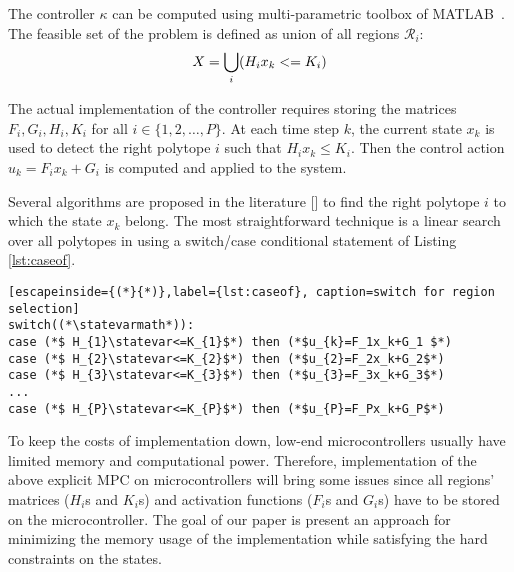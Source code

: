 
The controller $\kappa$ can be computed using multi-parametric toolbox of MATLAB~\cite{matlabMPT, matlabYALMIP}. The feasible set of the problem is defined as union of all regions $\mathcal{R}_{i}$:
\begin{equation}
X = \bigcup_{i}(H_{i}x_{k}<=K_{i})
\end{equation}


The actual implementation of the controller requires storing the matrices $F_i,G_i,H_i,K_i$ for all $i\in\{1,2,\ldots,P\}$. At each time step $k$, the current state $x_k$ is used to detect the right polytope $i$ such that $H_i x_k\le K_i$. Then the control action $u_k = F_i x_k + G_i$ is computed and applied to the system.

Several algorithms are proposed in the literature [\cite{Mnnigmann:2011,Jones:2006}] to find the right polytope $i$ to which the state $x_k$ belong. The most straightforward technique is a linear search over all polytopes in \Sadegh{\statespace\space} using a switch/case conditional statement of Listing \ref{lst:caseof}.

\begin{lstlisting}[escapeinside={(*}{*)},label={lst:caseof}, caption=switch for region selection]
switch((*\statevarmath*)):
case (*$ H_{1}\statevar<=K_{1}$*) then (*$u_{k}=F_1x_k+G_1 $*)
case (*$ H_{2}\statevar<=K_{2}$*) then (*$u_{2}=F_2x_k+G_2$*)
case (*$ H_{3}\statevar<=K_{3}$*) then (*$u_{3}=F_3x_k+G_3$*)
...
case (*$ H_{P}\statevar<=K_{P}$*) then (*$u_{P}=F_Px_k+G_P$*)
\end{lstlisting}

To keep the costs of implementation down, low-end microcontrollers usually have limited memory and computational power. Therefore, implementation of the above explicit MPC on microcontrollers will bring some issues since all regions' matrices ($H_i$s and $K_i$s) and activation functions ($F_i$s and $G_i$s) have to be stored on the microcontroller. The goal of our paper is present an approach for minimizing the memory usage of the implementation while satisfying the hard constraints on the states. 
